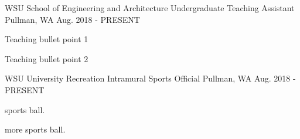\begin{cventries}
  \cventry
    {WSU School of Engineering and Architecture}
    {Undergraduate Teaching Assistant}
    {Pullman, WA}
    {Aug. 2018 - PRESENT}
    {
      \begin{cvitems}
        \item {Teaching bullet point 1}
        \item {Teaching bullet point 2}
      \end{cvitems}
    }
  \cventry
    {WSU University Recreation}
    {Intramural Sports Official}
    {Pullman, WA}
    {Aug. 2018 - PRESENT}
    {
      \begin{cvitems}
        \item {sports ball.}
        \item {more sports ball.}
      \end{cvitems}
    }
    
\end{cventries}
